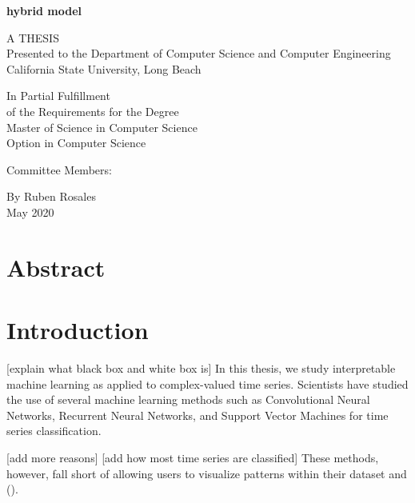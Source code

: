 \documentclass{turabian-thesis}
\begin{document}
\frontmatter
\thispagestyle{empty}

\begin{center}
   
   \textbf{hybrid model}
   
   \vspace*{\baselineskip} 
      
   A THESIS \\
   Presented to the Department of Computer Science and Computer Engineering \\
   California State University, Long Beach
   
   \vspace*{\baselineskip} 

   In Partial Fulfillment \\
   of the Requirements for the Degree \\
   Master of Science in Computer Science \\
   Option in Computer Science
   
   \vspace*{\baselineskip} 

   Committee Members: \\
   
   \vspace*{\baselineskip} 

   By Ruben Rosales \\
   May 2020
\end{center}

\pagebreak

\chapter*{Abstract}

\tableofcontents
\listofillustrations

\mainmatter

\chapter{Introduction}
[explain what black box and white box is]
In this thesis, we study interpretable machine learning as applied to complex-valued time series. Scientists have studied the use of several machine learning methods such as Convolutional Neural Networks, Recurrent Neural Networks, and Support Vector Machines for time series classification. 

[add more reasons] 
[add how most time series are classified]
These methods, however, fall short of allowing users to visualize patterns within their dataset and (). 
\end{document}
